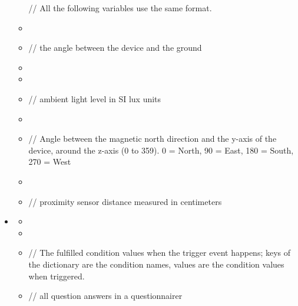 \documentclass[a4paper]{scrreprt}
\begin{document}
\begin{itemize}
\begin{itemize}
                                \par // All the following variables use the same format.
                            \item {}
                            \item {}
                                \par // the angle between the device and the ground
                            \item {}
                            \item {}
                            \item {}
                                \par // ambient light level in SI lux units
                            \item {}
                            \item {}
                                \par // Angle between the magnetic north direction and the y-axis of the device, around the z-axis (0 to 359). 0 = North, 90 = East, 180 = South, 270 = West
                            \item {}
                            \item {}
                                \par // proximity sensor distance measured in centimeters
                        \end{itemize}

                    \item {}
                        \begin{itemize}
                            \item {}
                            \item {}
                            \item {}
                                \par // The fulfilled condition values when the trigger event happens; keys of the dictionary are the condition names, values are the condition values when triggered.
                            \item {}
                                \par // all question answers in a questionnairer
                        \end{itemize}


\end{itemize}
\end{document}
